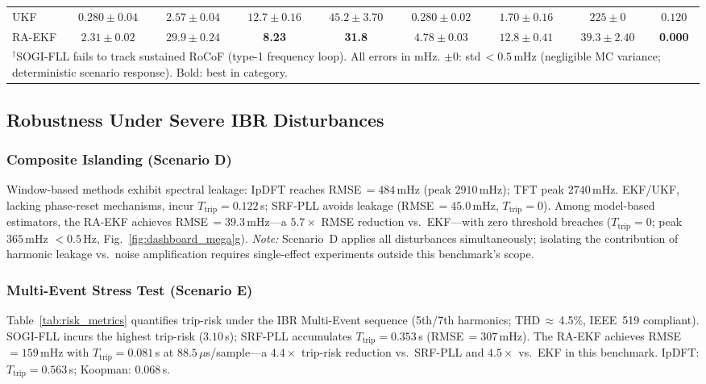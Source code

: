 \begin{table}[t!]
{\begin{tabular}{l cc | cc | cc | cc}
    UKF   & $0.280 \pm 0.04$ & $2.57 \pm 0.04$ & $12.7 \pm 0.16$ & $45.2 \pm 3.70$ & $0.280 \pm 0.02$ & $1.70 \pm 0.16$ & $225 \pm 0$ & $0.120$ \\
    RA-EKF & $2.31 \pm 0.02$ & $29.9 \pm 0.24$ & \textbf{8.23} & \textbf{31.8} & $4.78 \pm 0.03$ & $12.8 \pm 0.41$ & $39.3 \pm 2.40$ & \textbf{0.000} \\
    \bottomrule
    \multicolumn{9}{l}{\scriptsize $^\dagger$SOGI-FLL fails to track sustained RoCoF (type-1 frequency loop). All errors in mHz. $\pm 0$: std\,$<0.5$\,mHz (negligible MC variance; deterministic scenario response). Bold: best in category.}
  \end{tabular}}
\end{table}

\subsection{Robustness Under Severe IBR Disturbances}

\subsubsection{Composite Islanding (Scenario D)}

Window-based methods exhibit spectral leakage: IpDFT reaches RMSE\,$=484$\,mHz (peak $2910$\,mHz); TFT peak $2740$\,mHz.
EKF/UKF, lacking phase-reset mechanisms, incur $T_{\mathrm{trip}}=0.122$\,s; SRF-PLL avoids leakage (RMSE\,$=45.0$\,mHz, $T_{\mathrm{trip}}=0$).
Among model-based estimators, the RA-EKF achieves RMSE\,$=39.3$\,mHz---a $5.7\!\times$ RMSE reduction vs.\ EKF---with zero threshold breaches ($T_{\mathrm{trip}}=0$; peak $365$\,mHz $<0.5$\,Hz, Fig.~\ref{fig:dashboard_mega}g).
\emph{Note:} Scenario~D applies all disturbances simultaneously; isolating
the contribution of harmonic leakage vs.\ noise amplification requires
single-effect experiments outside this benchmark's scope.

\subsubsection{Multi-Event Stress Test (Scenario E)}

Table~\ref{tab:risk_metrics} quantifies trip-risk under the IBR Multi-Event sequence (5th/7th harmonics; THD\,$\approx$\,4.5\%, IEEE~519 compliant). SOGI-FLL incurs the highest trip-risk ($3.10$\,s); SRF-PLL accumulates $T_{\mathrm{trip}}=0.353$\,s (RMSE\,$=307$\,mHz). The RA-EKF achieves RMSE\,$=159$\,mHz with $T_{\mathrm{trip}}=0.081$\,s at $88.5\,\mu$s/sample---a $4.4\!\times$ trip-risk reduction vs.\ SRF-PLL and $4.5\!\times$ vs.\ EKF in this benchmark. IpDFT: $T_{\mathrm{trip}}=0.563$\,s; Koopman: $0.068$\,s.

